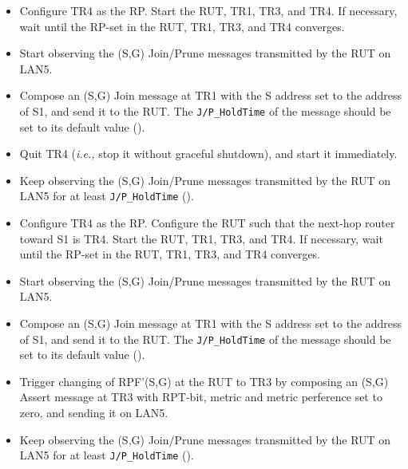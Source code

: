 \documentclass[11pt]{report}
\newcommand{\ie}{\emph{i.e.,}\xspace}
\begin{document}

\begin{itemize}

  \item Configure TR4 as the RP. Start the RUT, TR1, TR3, and TR4. If
  necessary, wait until the RP-set in the RUT, TR1, TR3, and TR4
  converges.

  \item Start observing the (S,G) Join/Prune messages transmitted by the
  RUT on LAN5.

  \item Compose an (S,G) Join message at TR1 with the S address set to the
  address of S1, and send it to the RUT. 
  The \verb=J/P_HoldTime= of the message should be set to its default
  value ({\PimsmJPHoldTime}).

  \item Quit TR4 (\ie stop it without graceful shutdown), and start it
  immediately.

  \item Keep observing the (S,G) Join/Prune messages transmitted by the
  RUT on LAN5 for at least \verb=J/P_HoldTime= ({\PimsmJPHoldTime}).

\end{itemize}


\begin{itemize}

  \item Configure TR4 as the RP.
  Configure the RUT such that the next-hop router toward S1 is TR4.
  Start the RUT, TR1, TR3, and TR4.
  If necessary, wait until the RP-set in the RUT, TR1, TR3, and TR4
  converges.

  \item Start observing the (S,G) Join/Prune messages transmitted by the
  RUT on LAN5.

  \item Compose an (S,G) Join message at TR1 with the S address set to the
  address of S1, and send it to the RUT. 
  The \verb=J/P_HoldTime= of the message should be set to its default
  value ({\PimsmJPHoldTime}).

  \item Trigger changing of RPF'(S,G) at the RUT to TR3 by composing an
  (S,G) Assert message at TR3 with RPT-bit, metric and metric 
  perference set to zero, and sending it on LAN5.

  \item Keep observing the (S,G) Join/Prune messages transmitted by the
  RUT on LAN5 for at least \verb=J/P_HoldTime= ({\PimsmJPHoldTime}).

\end{itemize}
\end{document}
